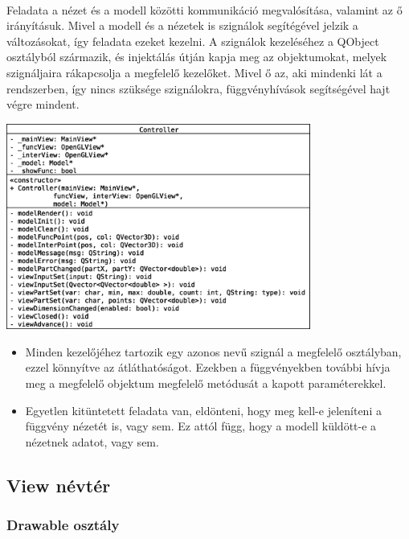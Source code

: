 \documentclass[12pt]{report}
\begin{document}
\paragraph{}
Feladata a nézet és a modell közötti kommunikáció megvalósítása, valamint az ő irányításuk. Mivel a modell és a nézetek is szignálok segítégével jelzik a változásokat, így feladata ezeket kezelni. A szignálok kezeléséhez a QObject osztályból származik, és injektálás útján kapja meg az objektumokat, melyek szignáljaira rákapcsolja a megfelelő kezelőket. Mivel ő az, aki mindenki lát a rendszerben, így nincs szüksége szignálokra, függvényhívások segítségével hajt végre mindent.
\begin{center}
\includegraphics[width=10cm]{pics/uml/Controller}
\end{center}
\begin{itemize}
\item Minden kezelőjéhez tartozik egy azonos nevű szignál a megfelelő osztályban, ezzel könnyítve az átláthatóságot. Ezekben a függvényekben további hívja meg a megfelelő objektum megfelelő metódusát a kapott paraméterekkel.
\item Egyetlen kitüntetett feladata van, eldönteni, hogy meg kell-e jeleníteni a függvény nézetét is, vagy sem. Ez attól függ, hogy a modell küldött-e a nézetnek adatot, vagy sem.
\end{itemize}

\subsection{View névtér}
\subsubsection{Drawable osztály}
\end{document}
